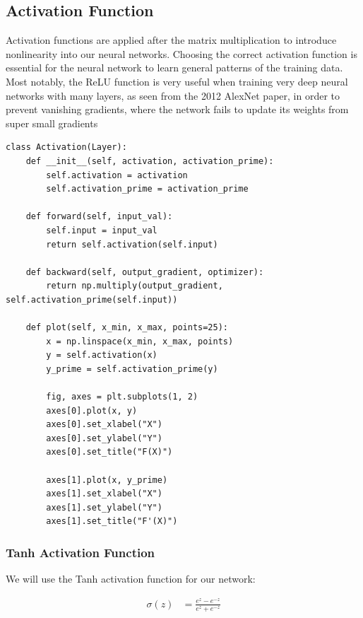 \documentclass[openany]{book}
\begin{document}
    \subsection{Activation Function}\label{activation-function}

Activation functions are applied after the matrix multiplication to
introduce nonlinearity into our neural networks. Choosing the correct
activation function is essential for the neural network to learn general
patterns of the training data. Most notably, the ReLU function is very
useful when training very deep neural networks with many layers, as seen
from the 2012 AlexNet paper, in order to prevent vanishing gradients,
where the network fails to update its weights from super small gradients

\begin{tcolorbox}
\tiny
\begin{verbatim}
class Activation(Layer):
    def __init__(self, activation, activation_prime):
        self.activation = activation
        self.activation_prime = activation_prime

    def forward(self, input_val):
        self.input = input_val
        return self.activation(self.input)

    def backward(self, output_gradient, optimizer):
        return np.multiply(output_gradient, self.activation_prime(self.input))

    def plot(self, x_min, x_max, points=25):
        x = np.linspace(x_min, x_max, points)
        y = self.activation(x)
        y_prime = self.activation_prime(y)

        fig, axes = plt.subplots(1, 2)
        axes[0].plot(x, y)
        axes[0].set_xlabel("X")
        axes[0].set_ylabel("Y")
        axes[0].set_title("F(X)")

        axes[1].plot(x, y_prime)
        axes[1].set_xlabel("X")
        axes[1].set_ylabel("Y")
        axes[1].set_title("F'(X)")
\end{verbatim}
\end{tcolorbox}

    \subsubsection{Tanh Activation Function}\label{tanh-activation-function}

We will use the Tanh activation function for our network:

\begin{align*}
\sigma(z) &= \frac{e^z-e^{-z}}{e^z+e^{-z}}
\end{align*}
\end{document}
